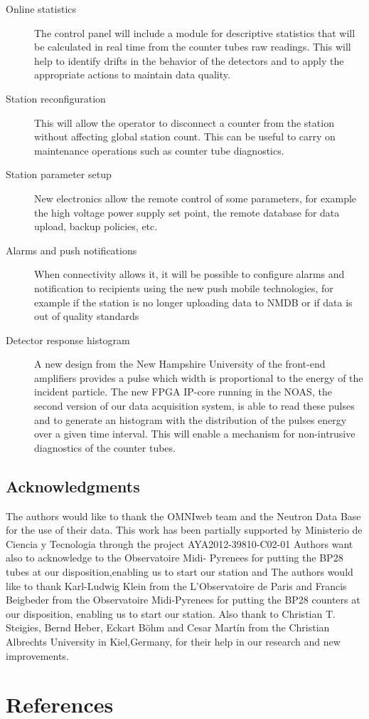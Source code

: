 \documentclass[a4paper]{jpconf}
\begin{document}
\begin{description}
    \item[Online statistics] The control panel will include a module for
        descriptive statistics that will be calculated in real time from the
        counter tubes raw readings. This will help to identify drifts in the
        behavior of the detectors and to apply the appropriate actions to
        maintain data quality.
    \item[Station reconfiguration] This will allow the operator to disconnect a
        counter from the station without affecting global station count. This
        can be useful to carry on maintenance operations such as counter tube
        diagnostics. 
    \item[Station parameter setup] New electronics allow the remote control of
        some parameters, for example the high voltage power supply set point,
        the remote database for data upload, backup policies, etc.
    \item[Alarms and push notifications] When connectivity allows it, it will
        be possible to configure alarms and notification to recipients using
        the new push mobile technologies, for example if the station is no
        longer uploading data to NMDB or if data is out of quality standards
    \item[Detector response histogram] A new design from the New
        Hampshire University of the front-end amplifiers provides a pulse which
        width is proportional to the energy of the incident particle. The new
        FPGA IP-core running in the NOAS, the second version of our data
        acquisition system, is able to read these pulses and to generate an
        histogram with the distribution of the pulses energy over a given time
        interval. This will enable a mechanism for non-intrusive diagnostics of
        the counter tubes. 
\end{description}


\subsection*{Acknowledgments} 

The authors would like to thank the OMNIweb team and the Neutron Data Base for
the use of their data. This work has been partially supported by Ministerio de
Ciencia y Tecnologia through the project AYA2012-39810-C02-01 Authors want also
to acknowledge to the Observatoire Midi- Pyrenees for putting the BP28 tubes at
our disposition,enabling us to start our station and The authors would like to
thank Karl-Ludwig Klein from the L’Observatoire de Paris and Francis Beigbeder
from the Observatoire Midi-Pyrenees for putting the BP28 counters at our
disposition, enabling us to start our station. Also thank to Christian T.
Steigies, Bernd Heber, Eckart Böhm and Cesar Martín from the Christian
Albrechts University in Kiel,Germany, for their help in our research and new
improvements.


\section*{References}
 
\end{document}
